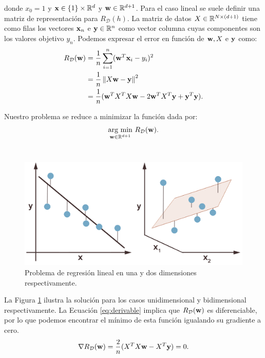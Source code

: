 \documentclass[oneside,openright,titlepage,numbers=noenddot,openany,headinclude,footinclude=true,
cleardoublepage=empty,abstractoff,BCOR=5mm,paper=a4,fontsize=12pt,main=spanish]{scrreprt}
\begin{document}
donde $x_0=1$ y $\textbf{x} \in \{1\} \times \mathbb{R}^d$ y $\textbf{w} \in \mathbb{R}^{d+1}$. Para el caso lineal se suele definir una matriz de representación para $R_{\mathcal{D}}(h)$. La matriz de datos $X\in \mathbb{R}^{N \times (d+1)}$ tiene como filas los vectores $\textbf{x}_n$ e $\textbf{y}\in \mathbb{R}^n$ como vector columna cuyas componentes son los valores objetivo $y_n$. Podemos expresar el error en función de $\textbf{w}, X$ e $\textbf{y}$ como:
\begin{equation}
\begin{split}
    R_{\mathcal{D}}(\textbf{w})&=\frac{1}{n}\sum_{i=1}^n (\textbf{w}^T\textbf{x}_i-y_i)^2\\
    &=\frac{1}{n} \left\lVert X\textbf{w}-\textbf{y}\right\rVert^2\\
    &=\frac{1}{n} (\textbf{w}^TX^TX\textbf{w} -2\textbf{w}^TX^T\textbf{y}+\textbf{y}^T\textbf{y}).
\end{split}
\label{eq:derivable}
\end{equation}

Nuestro problema se reduce a minimizar la función dada por: 
\begin{equation}
    \underset{\nm{w}\in \R^{d+1}}{\text{arg min}} \ R_{\mathcal{D}}(\nm{w}).
    \label{eq:soloptima}
\end{equation}\

\begin{figure}[h]
	\centering
	\includegraphics[width=13.3cm]{linear_regresion.png}
	\caption{Problema de regresión lineal en una y dos dimensiones respectivamente.}
    \label{fig:reglin}
\end{figure}

La Figura \ref{fig:reglin} ilustra la solución para los casos unidimensional y bidimensional respectivamente. La Ecuación \ref{eq:derivable} implica que $R_{\mathcal{D}}(\textbf{w})$ es diferenciable, por lo que podemos encontrar el mínimo de esta función igualando su gradiente a cero.
\begin{equation*}
    \nabla R_{\mathcal{D}}(\textbf{w}) = \frac{2}{n} (X^TX\textbf{w}-X^T\textbf{y}) = 0.
\end{equation*}
\end{document}
